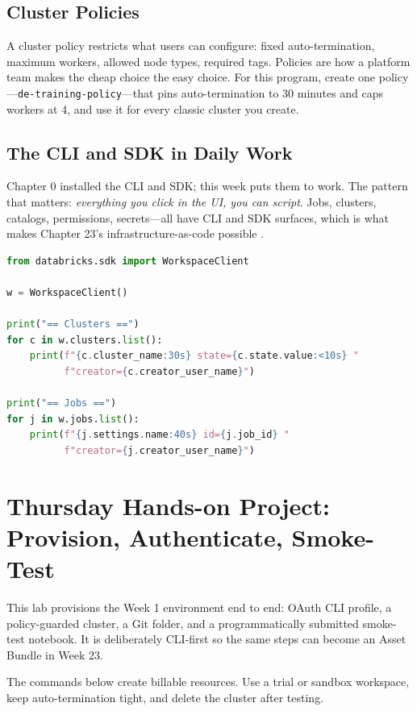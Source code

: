 \subsection{Cluster Policies}
A cluster policy restricts what users can configure: fixed auto-termination, maximum workers, allowed node types, required tags. Policies are how a platform team makes the cheap choice the easy choice. For this program, create one policy---\texttt{de-training-policy}---that pins auto-termination to 30 minutes and caps workers at 4, and use it for every classic cluster you create.

\subsection{The CLI and SDK in Daily Work}
Chapter 0 installed the CLI and SDK; this week puts them to work. The pattern that matters: \emph{everything you click in the UI, you can script}. Jobs, clusters, catalogs, permissions, secrets---all have CLI and SDK surfaces, which is what makes Chapter 23's infrastructure-as-code possible \cite{databricksCLI,databricksSDK}.

\begin{lstlisting}[language=Python,caption={SDK inventory script: clusters, jobs, and their owners.},label={lst:ch1-sdk-inventory}]
from databricks.sdk import WorkspaceClient

w = WorkspaceClient()

print("== Clusters ==")
for c in w.clusters.list():
    print(f"{c.cluster_name:30s} state={c.state.value:<10s} "
          f"creator={c.creator_user_name}")

print("== Jobs ==")
for j in w.jobs.list():
    print(f"{j.settings.name:40s} id={j.job_id} "
          f"creator={j.creator_user_name}")
\end{lstlisting}

\section{Thursday Hands-on Project: Provision, Authenticate, Smoke-Test}
This lab provisions the Week 1 environment end to end: OAuth CLI profile, a policy-guarded cluster, a Git folder, and a programmatically submitted smoke-test notebook. It is deliberately CLI-first so the same steps can become an Asset Bundle in Week 23.

\begin{notebox}
The commands below create billable resources. Use a trial or sandbox workspace, keep auto-termination tight, and delete the cluster after testing.
\end{notebox}


